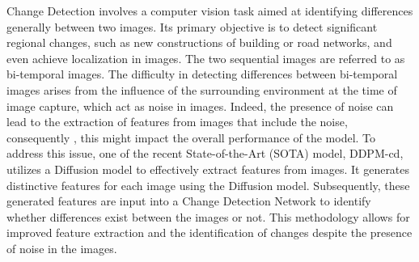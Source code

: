 \documentclass[../main.tex]{subfiles}
\begin{document}
Change Detection involves a computer vision task aimed at identifying differences generally between two images. Its primary objective is to detect significant regional changes, such as new constructions of building or road networks, and even achieve localization in images. The two sequential images are referred to as bi-temporal images. The difficulty in detecting differences between bi-temporal images arises from the influence of the surrounding environment at the time of image capture, which act as noise in images. Indeed, the presence of noise can lead to the extraction of features from images that include the noise, consequently , this might impact the overall performance of the model. To address this issue, one of the recent State-of-the-Art (SOTA) model, DDPM-cd, utilizes a Diffusion model to effectively extract features from images\cite{bandara2022ddpmcd}. It generates distinctive features for each image using the Diffusion model. Subsequently, these generated features are input into a Change Detection Network to identify whether differences exist between the images or not. This methodology allows for improved feature extraction and the identification of changes despite the presence of noise in the images.
\end{document}
